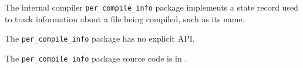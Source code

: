 

The internal compiler {\tt per\_compile\_info} package implements a state record 
used to track information about a file being compiled, such as its name.

The {\tt per\_compile\_info} package has no explicit API.

The {\tt per\_compile\_info} package source code is in .



